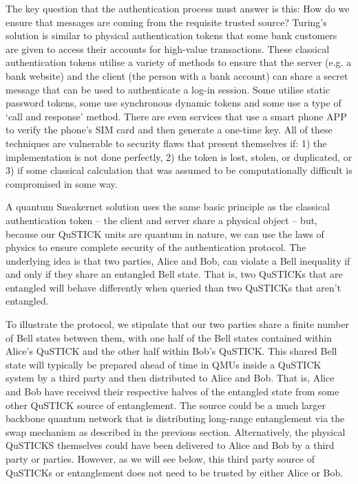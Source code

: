 \documentclass[twocolumn, aps, rmp, amsmath, amssymb, nofootinbib, superscriptaddress, longbibliography, floatfix, table-of-contents, eqsecnum]{revtex4-2}
\begin{document}
The key question that the authentication process must answer is this: How do we ensure that messages are coming from the requisite trusted source? Turing's solution is similar to physical authentication tokens that some bank customers are given to access their accounts for high-value transactions. These classical authentication tokens utilise a variety of methods to ensure that the server (e.g. a bank website) and the client (the person with a bank account) can share a secret message that can be used to authenticate a log-in session. Some utilise static password tokens, some use synchronous dynamic tokens and some use a type of `call and response' method. There are even services that use a smart phone APP to verify the phone's SIM card and then generate a one-time key. All of these techniques are vulnerable to security flaws that present themselves if: 1) the implementation is not done perfectly, 2) the token is lost, stolen, or duplicated, or 3) if some classical calculation that was assumed to be computationally difficult is compromised in some way. 

A quantum Sneakernet solution uses the same basic principle as the classical authentication token -- the client and server share a physical object -- but, because our QuSTICK units are quantum in nature, we can use the laws of physics to ensure complete security of the authentication protocol. The underlying idea is that two parties, Alice and Bob, can violate a Bell inequality if and only if they share an entangled Bell state. That is, two QuSTICKs that are entangled will behave differently when queried than two QuSTICKs that aren't entangled.

To illustrate the protocol, we stipulate that our two parties share a finite number of Bell states between them, with one half of the Bell states contained within Alice's QuSTICK and the other half within Bob's QuSTICK. This shared Bell state will typically be prepared ahead of time in QMUs inside a QuSTICK system by a third party and then distributed to Alice and Bob. That is, Alice and Bob have received their respective halves of the entangled state from some other QuSTICK source of entanglement. The source could be a much larger backbone quantum network that is distributing long-range entanglement via the swap mechanism as described in the previous section. Alternatively, the physical QuSTICKS themselves could have been delivered to Alice and Bob by a third party or parties. However, as we will see below, this third party source of QuSTICKs or entanglement does not need to be trusted by either Alice or Bob.
\end{document}

